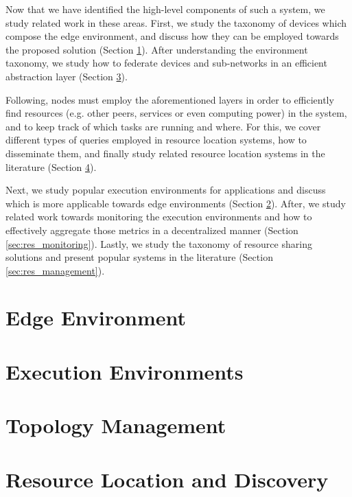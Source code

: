 Now that we have identified the high-level components of such a system, we study related work in these areas. First, we study the taxonomy of devices which compose the edge environment, and discuss how they can be employed towards the proposed solution (Section \ref{sec:edge_computing}). After understanding the environment taxonomy, we study how to federate devices and sub-networks in an efficient abstraction layer (Section \ref{sec:topology_management}).

Following, nodes must employ the aforementioned layers in order to efficiently find resources (e.g. other peers, services or even computing power) in the system, and to keep track of which tasks are running and where. For this, we cover different types of queries employed in resource location systems, how to disseminate them, and finally study related resource location systems in the  literature (Section \ref{sec:res_location}).

Next, we study popular execution environments for applications and discuss which is more applicable towards edge environments (Section \ref{sec:runtime_environments}). After, we study related work towards monitoring the execution environments and how to effectively aggregate those metrics in a decentralized manner (Section \ref{sec:res_monitoring}).  Lastly, we study the taxonomy of resource sharing solutions and present popular systems in the literature (Section \ref{sec:res_management}). 

\section{Edge Environment} \label{sec:edge_computing} 

\section{Execution Environments} \label{sec:runtime_environments} 

\section{Topology Management} \label{sec:topology_management} 

\section{Resource Location and Discovery} \label{sec:res_location} 

